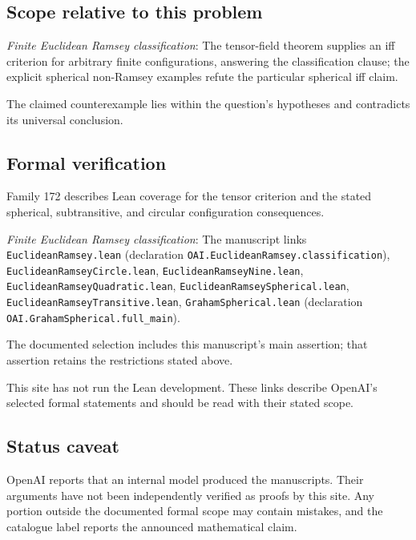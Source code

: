 \documentclass[11pt]{article}
\begin{document}
\subsection{Scope relative to this problem}
\textit{Finite Euclidean Ramsey classification}: The tensor-field theorem supplies an iff criterion for arbitrary finite configurations, answering the classification clause; the explicit spherical non-Ramsey examples refute the particular spherical iff claim.

The claimed counterexample lies within the question’s hypotheses and contradicts its universal conclusion.

\subsection{Formal verification}
Family 172 describes Lean coverage for the tensor criterion and the stated spherical, subtransitive, and circular configuration consequences.

\textit{Finite Euclidean Ramsey classification}: The manuscript links \texttt{EuclideanRamsey.lean} (declaration \texttt{OAI.EuclideanRamsey.classification}), \texttt{EuclideanRamseyCircle.lean}, \texttt{EuclideanRamseyNine.lean}, \texttt{EuclideanRamseyQuadratic.lean}, \texttt{EuclideanRamseySpherical.lean}, \texttt{EuclideanRamseyTransitive.lean}, \texttt{GrahamSpherical.lean} (declaration \texttt{OAI.GrahamSpherical.full\_main}).

The documented selection includes this manuscript’s main assertion; that assertion retains the restrictions stated above.

This site has not run the Lean development. These links describe OpenAI’s selected formal statements and should be read with their stated scope.

\subsection{Status caveat}
OpenAI reports that an internal model produced the manuscripts. Their arguments have not been independently verified as proofs by this site. Any portion outside the documented formal scope may contain mistakes, and the catalogue label reports the announced mathematical claim.
\end{document}
